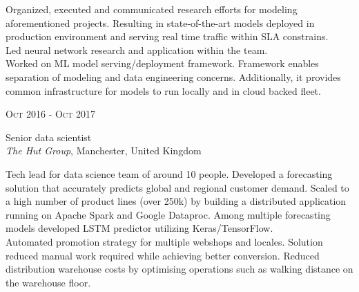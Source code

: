 \documentclass[10pt]{article} %
\begin{document}
{\begin{minipage}[t]{0.5\textwidth}
{Organized, executed and communicated research efforts for 
modeling aforementioned projects. Resulting in state-of-the-art 
models deployed in production environment and serving real 
time traffic within SLA constrains.
\\

Led neural network research and application within the team.
\\

Worked on ML model serving/deployment framework. Framework 
enables separation of modeling and data engineering concerns. 
Additionally, it provides common infrastructure for models to 
run locally and in cloud backed fleet.
}\\



\vspace{0.5cm}
{\raggedleft\textsc{Oct 2016 - Oct 2017}\par}

{\raggedright\large Senior data scientist\\
\textit{The Hut Group}, Manchester, United Kingdom\\[5pt]}

\normalsize{Tech lead for data science team of around 10 people. 
Developed a forecasting solution that accurately predicts global 
and regional customer demand. Scaled to a high number of product 
lines (over 250k) by building a distributed application running 
on Apache Spark and Google Dataproc. Among multiple forecasting models 
developed LSTM predictor utilizing Keras/TensorFlow.
\\

Automated promotion strategy for multiple webshops and locales. 
Solution reduced manual work required while achieving better conversion.
Reduced distribution warehouse costs by optimising operations such 
as walking distance on the warehouse floor.}\\



\end{minipage} %
\hfill
\begin{minipage}[t]{0.44\textwidth} %
\vspace{0pt} %


\end{minipage}}
\end{document}
